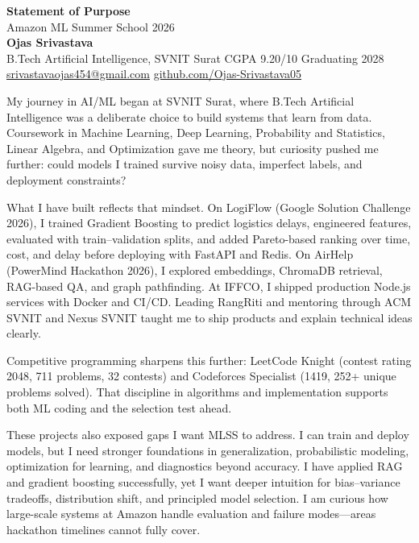 \documentclass[a4paper,11pt]{article}
\begin{document}
\begin{center}
{\LARGE \textbf{Statement of Purpose}} \\[2mm]
{\large Amazon ML Summer School 2026} \\[4mm]
\textbf{Ojas Srivastava} \\
B.Tech Artificial Intelligence, SVNIT Surat \textbar{} CGPA 9.20/10 \textbar{} Graduating 2028 \\
\href{mailto:srivastavaojas454@gmail.com}{srivastavaojas454@gmail.com} \textbar{}
\href{https://github.com/Ojas-Srivastava05}{github.com/Ojas-Srivastava05}
\end{center}

\vspace{2mm}

My journey in AI/ML began at SVNIT Surat, where B.Tech Artificial Intelligence was a deliberate choice to build systems that learn from data. Coursework in Machine Learning, Deep Learning, Probability and Statistics, Linear Algebra, and Optimization gave me theory, but curiosity pushed me further: could models I trained survive noisy data, imperfect labels, and deployment constraints?

What I have built reflects that mindset. On LogiFlow (Google Solution Challenge 2026), I trained Gradient Boosting to predict logistics delays, engineered features, evaluated with train--validation splits, and added Pareto-based ranking over time, cost, and delay before deploying with FastAPI and Redis. On AirHelp (PowerMind Hackathon 2026), I explored embeddings, ChromaDB retrieval, RAG-based QA, and graph pathfinding. At IFFCO, I shipped production Node.js services with Docker and CI/CD. Leading RangRiti and mentoring through ACM SVNIT and Nexus SVNIT taught me to ship products and explain technical ideas clearly.

Competitive programming sharpens this further: LeetCode Knight (contest rating 2048, 711 problems, 32 contests) and Codeforces Specialist (1419, 252+ unique problems solved). That discipline in algorithms and implementation supports both ML coding and the selection test ahead.

These projects also exposed gaps I want MLSS to address. I can train and deploy models, but I need stronger foundations in generalization, probabilistic modeling, optimization for learning, and diagnostics beyond accuracy. I have applied RAG and gradient boosting successfully, yet I want deeper intuition for bias--variance tradeoffs, distribution shift, and principled model selection. I am curious how large-scale systems at Amazon handle evaluation and failure modes---areas hackathon timelines cannot fully cover.
\end{document}
